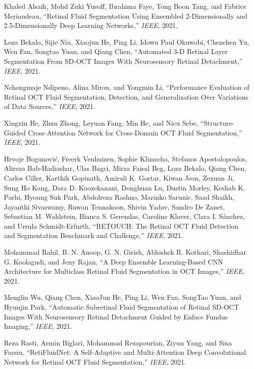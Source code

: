 \documentclass{article}
\begin{document}
%
%




\newpage

\begin{thebibliography}{}

Khaled Alsaih, Mohd Zuki Yusoff, Ibrahima Faye, Tong Boon Tang, and Fabrice Meriaudeau,
\newblock “Retinal Fluid Segmentation Using Ensembled 2-Dimensionally and 2.5-Dimensionally Deep Learning Networks,”
\newblock \emph{IEEE}, 2021.

Loza Bekalo, Sijie Niu, Xiaojun He, Ping Li, Idowu Paul Okuwobi, Chenchen Yu, Wen Fan, Songtao Yuan, and Qiang Chen,
\newblock “Automated 3-D Retinal Layer Segmentation From SD-OCT Images With Neurosensory Retinal Detachment,”
\newblock \emph{IEEE}, 2021.

Nchongmaje Ndipeno, Alina Miron, and Yongmin Li,
\newblock “Performance Evaluation of Retinal OCT Fluid Segmentation, Detection, and Generalization Over Variations of Data Sources,”
\newblock \emph{IEEE}, 2021.

Xingxin He, Zhun Zhong, Leyuan Fang, Min He, and Nicu Sebe,
\newblock “Structure-Guided Cross-Attention Network for Cross-Domain OCT Fluid Segmentation,”
\newblock \emph{IEEE}, 2021.


Hrvoje Bogunović, Freerk Venhuizen, Sophie Klimscha, Stefanos Apostolopoulos, Alireza Bab-Hadiashar, Ulas Bagci, Mirza Faisal Beg, Loza Bekalo, Qiang Chen, Carlos Ciller, Karthik Gopinath, Amirali K. Gostar, Kiwan Jeon, Zexuan Ji, Sung Ho Kang, Dara D. Koozekanani, Donghuan Lu, Dustin Morley, Keshab K. Parhi, Hyoung Suk Park, Abdolreza Rashno, Marinko Sarunic, Saad Shaikh, Jayanthi Sivaswamy, Ruwan Tennakoon, Shivin Yadav, Sandro De Zanet, Sebastian M. Waldstein, Bianca S. Gerendas, Caroline Klaver, Clara I. Sánchez, and Ursula Schmidt-Erfurth,
\newblock “RETOUCH: The Retinal OCT Fluid Detection and Segmentation Benchmark and Challenge,”
\newblock \emph{IEEE}, 2021.


Mohammad Rahil, B. N. Anoop, G. N. Girish, Abhishek R. Kothari, Shashidhar G. Koolagudi, and Jeny Rajan,
\newblock “A Deep Ensemble Learning-Based CNN Architecture for Multiclass Retinal Fluid Segmentation in OCT Images,”
\newblock \emph{IEEE}, 2021.

Menglin Wu, Qiang Chen, XiaoJun He, Ping Li, Wen Fan, SongTao Yuan, and Hyunjin Park,
\newblock “Automatic Subretinal Fluid Segmentation of Retinal SD-OCT Images With Neurosensory Retinal Detachment Guided by Enface Fundus Imaging,”
\newblock \emph{IEEE}, 2021.

Reza Rasti, Armin Biglari, Mohammad Rezapourian, Ziyun Yang, and Sina Farsiu,
\newblock “RetiFluidNet: A Self-Adaptive and Multi-Attention Deep Convolutional Network for Retinal OCT Fluid Segmentation,”
\newblock \emph{IEEE}, 2021.


\end{thebibliography}
\clearpage
\end{document}
